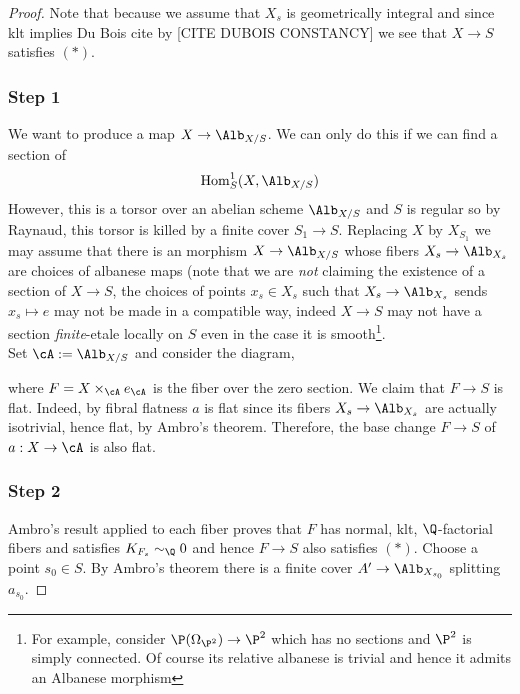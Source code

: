 \documentclass[12pt]{article}
\begin{document}
\begin{proof}
Note that because we assume that $X_s$ is geometrically integral and since klt implies Du Bois {\color{red} cite} by [CITE DUBOIS CONSTANCY] we see that $X \to S$ satisfies $(*)$.

\subsubsection{Step 1}
We want to produce a map $X \to \Alb_{X/S}$. We can only do this if we can find a section of
\[ \fHom_S^1(X, \Alb_{X/S}) \]
However, this is a torsor over an abelian scheme $\Alb_{X/S}$ and $S$ is regular so by Raynaud, this torsor is killed by a finite \etale cover $S_1 \to S$. Replacing $X$ by $X_{S_1}$ we may assume that there is an morphism $X \to \Alb_{X/S}$ whose fibers $X_s \to \Alb_{X_s}$ are choices of albanese maps (note that we are \textit{not} claiming the existence of a section of $X \to S$, the choices of points $x_s \in X_s$ such that $X_s \to \Alb_{X_s}$ sends $x_s \mapsto e$ may not be made in a compatible way, indeed $X \to S$ may not have a section \textit{finite}-etale locally on $S$ even in the case it is smooth\footnote{For example, consider $\P(\Omega_{\P^2}) \to \P^2$ which has no sections and $\P^2$ is simply connected. Of course its relative albanese is trivial and hence it admits an Albanese morphism}.
\bigskip\\
Set $\cA := \Alb_{X/S}$ and consider the diagram,
\begin{center}
\end{center}
where $F = X \times_{\cA} e_{\cA}$ is the fiber over the zero section. We claim that $F \to S$ is flat. Indeed, by fibral flatness $a$ is flat since its fibers $X_s \to \Alb_{X_s}$ are actually isotrivial, hence flat, by Ambro's theorem. Therefore, the base change $F \to S$ of $a : X \to \cA$ is also flat.

\subsubsection{Step 2}

Ambro's result applied to each fiber proves that $F$ has normal, klt, $\Q$-factorial fibers and satisfies $K_{F_s} \sim_{\Q} 0$ and hence $F \to S$ also satisfies $(*)$.
Choose a point $s_0 \in S$. By Ambro's theorem there is a finite \etale cover $A' \to \Alb_{X_{s_0}}$ splitting $a_{s_0}$. 


\end{proof}
\end{document}
